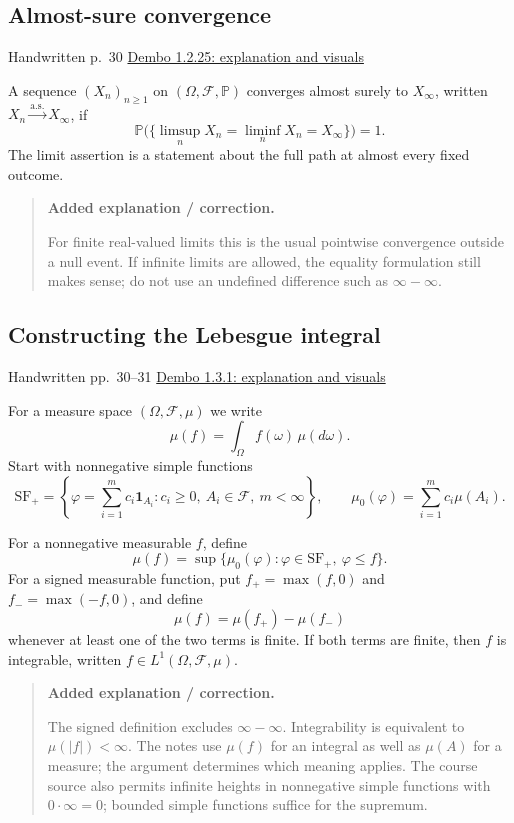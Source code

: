 \documentclass[11pt,letterpaper]{article}
\newcommand{\lecturesection}[1]{\subsection{#1}}
\begin{document}
\hypertarget{l4-s4}{}
\lecturesection{Almost-sure convergence}
{\small\textcolor{lectureink}{Handwritten p.\ 30} \quad \href{https://josephrbailey.com/probability/\#entry-1-2-25}{Dembo 1.2.25: explanation and visuals}}

A sequence $(X_n)_{n\ge1}$ on $(\Omega,\mathcal F,\mathbb P)$ converges almost surely to $X_\infty$, written $X_n\xrightarrow{\mathrm{a.s.}}X_\infty$, if \[\mathbb P\bigl(\{\limsup_n X_n=\liminf_n X_n=X_\infty\}\bigr)=1.\] The limit assertion is a statement about the full path at almost every fixed outcome.

\begin{quote}\small\textbf{Added explanation / correction.}

For finite real-valued limits this is the usual pointwise convergence outside a null event. If infinite limits are allowed, the equality formulation still makes sense; do not use an undefined difference such as $\infty-\infty$.
\end{quote}

\hypertarget{l4-s5}{}
\lecturesection{Constructing the Lebesgue integral}
{\small\textcolor{lectureink}{Handwritten pp.\ 30--31} \quad \href{https://josephrbailey.com/probability/\#entry-1-3-1}{Dembo 1.3.1: explanation and visuals}}

For a measure space $(\Omega,\mathcal F,\mu)$ we write \[\mu(f)=\int_\Omega f(\omega)\,\mu(d\omega).\] Start with nonnegative simple functions \[\mathrm{SF}_+=\left\{\varphi=\sum_{i=1}^{m}c_i\mathbf1_{A_i}:c_i\ge0,\ A_i\in\mathcal F,\ m<\infty\right\},\qquad \mu_0(\varphi)=\sum_{i=1}^{m}c_i\mu(A_i).\]

For a nonnegative measurable $f$, define \[\mu(f)=\sup\{\mu_0(\varphi):\varphi\in\mathrm{SF}_+,\ \varphi\le f\}.\] For a signed measurable function, put $f_+=\max(f,0)$ and $f_-=\max(-f,0)$, and define \[\mu(f)=\mu(f_+)-\mu(f_-)\] whenever at least one of the two terms is finite. If both terms are finite, then $f$ is integrable, written $f\in L^1(\Omega,\mathcal F,\mu)$.

\begin{quote}\small\textbf{Added explanation / correction.}

The signed definition excludes $\infty-\infty$. Integrability is equivalent to $\mu(|f|)<\infty$. The notes use $\mu(f)$ for an integral as well as $\mu(A)$ for a measure; the argument determines which meaning applies. The course source also permits infinite heights in nonnegative simple functions with $0\cdot\infty=0$; bounded simple functions suffice for the supremum.
\end{quote}
\end{document}
